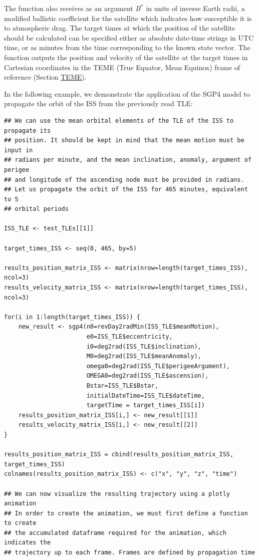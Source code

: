The function also receives as an argument \(B^*\) in units of inverse Earth radii, a modified ballistic coefficient for the satellite which indicates how susceptible it is to atmospheric drag. The target times at which the position of the satellite should be calculated can be specified either as absolute date-time strings in UTC time, or as minutes from the time corresponding to the known state vector. The function outputs the position and velocity of the satellite at the target times in Cartesian coordinates in the TEME (True Equator, Mean Equinox) frame of reference (Section \protect\hyperlink{teme}{TEME}).

In the following example, we demonstrate the application of the SGP4 model to propagate the orbit of the ISS from the previously read TLE:

\begin{verbatim}
## We can use the mean orbital elements of the TLE of the ISS to propagate its
## position. It should be kept in mind that the mean motion must be input in 
## radians per minute, and the mean inclination, anomaly, argument of perigee
## and longitude of the ascending node must be provided in radians.
## Let us propagate the orbit of the ISS for 465 minutes, equivalent to 5
## orbital periods

ISS_TLE <- test_TLEs[[1]]

target_times_ISS <- seq(0, 465, by=5)

results_position_matrix_ISS <- matrix(nrow=length(target_times_ISS), ncol=3)
results_velocity_matrix_ISS <- matrix(nrow=length(target_times_ISS), ncol=3)

for(i in 1:length(target_times_ISS)) {
    new_result <- sgp4(n0=revDay2radMin(ISS_TLE$meanMotion),
                       e0=ISS_TLE$eccentricity,
                       i0=deg2rad(ISS_TLE$inclination),
                       M0=deg2rad(ISS_TLE$meanAnomaly),
                       omega0=deg2rad(ISS_TLE$perigeeArgument),
                       OMEGA0=deg2rad(ISS_TLE$ascension),
                       Bstar=ISS_TLE$Bstar,
                       initialDateTime=ISS_TLE$dateTime,
                       targetTime = target_times_ISS[i])
    results_position_matrix_ISS[i,] <- new_result[[1]]
    results_velocity_matrix_ISS[i,] <- new_result[[2]]
}

results_position_matrix_ISS = cbind(results_position_matrix_ISS, target_times_ISS)
colnames(results_position_matrix_ISS) <- c("x", "y", "z", "time")

## We can now visualize the resulting trajectory using a plotly animation
## In order to create the animation, we must first define a function to create
## the accumulated dataframe required for the animation, which indicates the 
## trajectory up to each frame. Frames are defined by propagation time


\end{verbatim}
